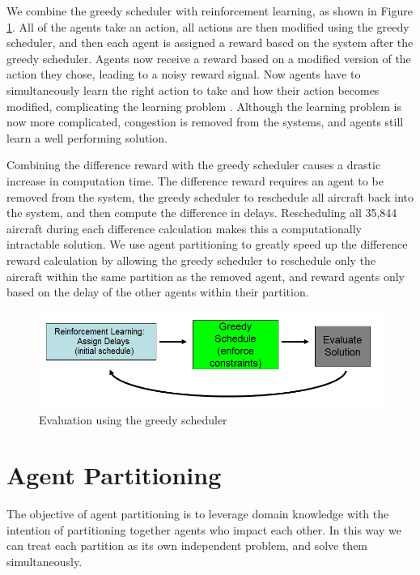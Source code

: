 \documentclass[onehalf,11pt]{beavtex}
\begin{document}
We combine the greedy scheduler with reinforcement learning, as shown in Figure \ref{LearningCycle}. All of the agents take an action, all actions are then modified using the greedy scheduler, and then each agent is assigned a reward based on the system after the greedy scheduler. Agents now receive a reward based on a modified version of the action they chose, leading to a noisy reward signal. Now agents have to simultaneously learn the right action to take and how their action becomes modified, complicating the learning problem \cite{journals/advcs/AgoginoT09}. Although the learning problem is now more complicated, congestion is removed from the systems, and agents still learn a well performing solution.

Combining the difference reward with the greedy scheduler causes a drastic increase in computation time. The difference reward requires an agent to be removed from the system, the greedy scheduler to reschedule all aircraft back into the system, and then compute the difference in delays. Rescheduling all 35,844 aircraft during each difference calculation makes this a computationally intractable solution. We use agent partitioning to greatly speed up the difference reward calculation by allowing the greedy scheduler to reschedule only the aircraft within the same partition as the removed agent, and reward agents only based on the delay of the other agents within their partition.

\begin{figure}[]
\centering
\includegraphics[width=1.0\columnwidth]{LearningCycle}
\caption{Evaluation using the greedy scheduler}
\label{LearningCycle}
\end{figure}

\section{Agent Partitioning}
The objective of agent partitioning is to leverage domain knowledge with the intention of partitioning together agents who impact each other. In this way we can treat each partition as its own independent problem, and solve them simultaneously.
\end{document}
